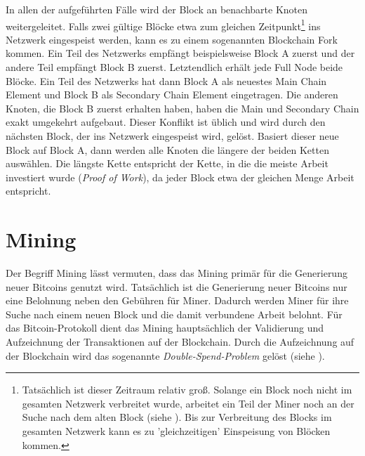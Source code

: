 \documentclass[ngerman,runningheads,a4paper]{llncs}[2018/03/10]
\newcommand{\commentatside}[1]{\pdfcomment[color={0.045 0.278 0.643},icon=Note]{#1}}
\newcommand{\todo}[1]{\commentatside{#1}}
\begin{document}
In allen der aufgeführten Fälle wird der Block an benachbarte Knoten weitergeleitet. Falls zwei gültige Blöcke etwa zum gleichen Zeitpunkt\footnote{Tatsächlich ist dieser Zeitraum relativ groß. Solange ein Block noch nicht im gesamten Netzwerk verbreitet wurde, arbeitet ein Teil der Miner noch an der Suche nach dem alten Block (siehe ). Bis zur Verbreitung des Blocks im gesamten Netzwerk kann es zu 'gleichzeitigen' Einspeisung von Blöcken kommen.} ins Netzwerk eingespeist werden, kann es zu einem sogenannten Blockchain Fork kommen. Ein Teil des Netzwerks empfängt beispielsweise Block A zuerst und der andere Teil empfängt Block B zuerst. Letztendlich erhält jede Full Node beide Blöcke. Ein Teil des Netzwerks hat dann Block A als neuestes Main Chain Element und Block B als Secondary Chain Element eingetragen. Die anderen Knoten, die Block B zuerst erhalten haben, haben die Main und Secondary Chain exakt umgekehrt aufgebaut. Dieser Konflikt ist üblich und wird durch den nächsten Block, der ins Netzwerk eingespeist wird, gelöst. Basiert dieser neue Block auf Block A, dann werden alle Knoten die längere der beiden Ketten auswählen. Die längste Kette entspricht der Kette, in die die meiste Arbeit investiert wurde (\textit{Proof of Work}), da jeder Block etwa der gleichen Menge Arbeit entspricht.

\section{Mining}\label{sec:mining}

Der Begriff Mining lässt vermuten, dass das Mining primär für die Generierung neuer Bitcoins genutzt wird. Tatsächlich ist die Generierung neuer Bitcoins nur eine Belohnung neben den Gebühren für Miner. Dadurch werden Miner für ihre Suche nach einem neuen Block und die damit verbundene Arbeit belohnt. Für das Bitcoin-Protokoll dient das Mining hauptsächlich der Validierung und Aufzeichnung der Transaktionen auf der Blockchain. Durch die Aufzeichnung auf\todo{"auf" oder "in" hier} der Blockchain wird das sogenannte \textit{Double-Spend-Problem} gelöst (siehe ).
\end{document}
